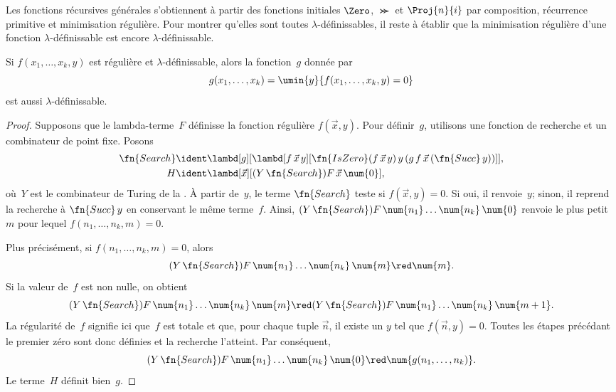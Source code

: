 \documentclass[../../../include/open-logic-section]{subfiles}
\begin{document}

Les fonctions récursives générales
s'obtiennent à partir des fonctions
initiales $\Zero$, $\Succ$ et
$\Proj{n}{i}$ par composition,
récurrence primitive et minimisation
régulière. Pour montrer qu'elles sont
toutes $\lambda$-définissables, il
reste à établir que la minimisation
régulière d'une fonction
$\lambda$-définissable est encore
$\lambda$-définissable.

\begin{lem}
Si $f(x_1,\dots,x_k,y)$ est régulière
et $\lambda$-définissable, alors la
fonction~$g$ donnée par
\[
  g(x_1,\dots,x_k)
    =\umin{y}{f(x_1,\dots,x_k,y)=0}
\]
est aussi $\lambda$-définissable.
\end{lem}

\begin{proof}
Supposons que le lambda-terme~$F$
définisse la fonction régulière
$f(\vec x,y)$. Pour définir~$g$,
utilisons une fonction de recherche
et un combinateur de point fixe.
Posons
\begin{align*}
  \fn{Search} &\ident
    \lambd[g][\lambd[f\,\vec x\,y][
      \fn{IsZero}(f\,\vec x\,y)\,y\,
      (g\,f\,\vec x\,(\fn{Succ}\,y))]],\\
  H &\ident
    \lambd[\vec x][
      (Y\,\fn{Search})F\,\vec x\,\num{0}],
\end{align*}
où~$Y$ est le combinateur de Turing
de la .
À partir de~$y$, le terme
$\fn{Search}$ teste si
$f(\vec x,y)=0$. Si oui, il renvoie~$y$;
sinon, il reprend la recherche à
$\fn{Succ}\,y$ en conservant le même
terme~$f$. Ainsi,
$(Y\,\fn{Search})F\,
\num{n_1}\dots\num{n_k}\,\num{0}$
renvoie le plus petit~$m$ pour lequel
$f(n_1,\dots,n_k,m)=0$.

Plus précisément, si
$f(n_1,\dots,n_k,m)=0$, alors
\[
  (Y\,\fn{Search})F\,
    \num{n_1}\dots\num{n_k}\,\num{m}
    \red\num{m}.
\]
Si la valeur de~$f$ est non nulle,
on obtient
\[
  (Y\,\fn{Search})F\,
    \num{n_1}\dots\num{n_k}\,\num{m}
    \red (Y\,\fn{Search})F\,
      \num{n_1}\dots\num{n_k}\,\num{m+1}.
\]
La régularité de~$f$ signifie ici
que~$f$ est totale et que, pour
chaque tuple $\vec n$, il existe un
$y$ tel que $f(\vec n,y)=0$.
Toutes les étapes précédant le
premier zéro sont donc définies et
la recherche l'atteint. Par conséquent,
\[
  (Y\,\fn{Search})F\,
    \num{n_1}\dots\num{n_k}\,\num{0}
    \red
    \num{g(n_1,\dots,n_k)}.
\]
Le terme~$H$ définit bien~$g$.
\end{proof}
\end{document}
